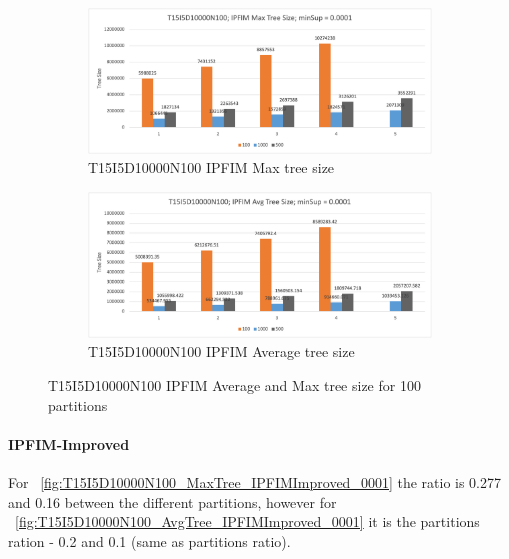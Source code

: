 \begin{figure}
  \centering
  \begin{subfigure}{\linewidth}
  \centering
  \includegraphics[width=\linewidth ,height=\textheight, keepaspectratio]{figures/4iterations/T15I5D10000N100_MaxTree_IPFIM_0001}
  \caption{T15I5D10000N100 IPFIM Max tree size}
  \label{fig:T15I5D10000N100_MaxTree_IPFIM_0001}
\end{subfigure}
  \begin{subfigure}{\linewidth}
  \centering
  \includegraphics[width=\linewidth ,height=\textheight, keepaspectratio]{figures/4iterations/T15I5D10000N100_AvgTree_IPFIM_0001}
  \caption{T15I5D10000N100 IPFIM Average tree size}
  \label{fig:T15I5D10000N100_AvgTree_IPFIM_0001}
\end{subfigure}
\caption{T15I5D10000N100 IPFIM Average and Max tree size for 100 partitions}
\end{figure}


\paragraph{IPFIM-Improved}
For ~\autoref{fig:T15I5D10000N100_MaxTree_IPFIMImproved_0001} the ratio is 0.277 and 0.16 between the different partitions, however for ~\autoref{fig:T15I5D10000N100_AvgTree_IPFIMImproved_0001} it is the partitions ration - 0.2 and 0.1 (same as partitions ratio).

